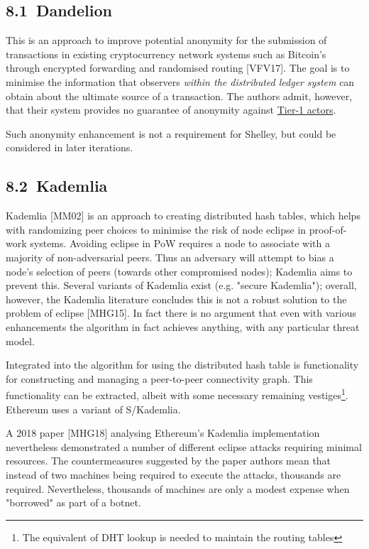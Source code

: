 \documentclass[]{article}
\begin{document}
\hypertarget{dandelion}{%
\subsection{​8.1​~Dandelion}\label{dandelion}}

This is an approach to improve potential anonymity for the submission of
transactions in existing cryptocurrency network systems such as
Bitcoin's through encrypted forwarding and randomised routing
{[}VFV17{]}. The goal is to minimise the information that observers
\emph{within the distributed ledger} \emph{system} can obtain about the
ultimate source of a transaction. The authors admit, however, that their
system provides no guarantee of anonymity against
\protect\hyperlink{tier-1-actors}{{Tier-1 actors}}.

Such anonymity enhancement is not a requirement for Shelley, but could
be considered in later iterations.

\hypertarget{kademlia}{%
\subsection{​8.2​~Kademlia}\label{kademlia}}

Kademlia {[}MM02{]} is an approach to creating distributed hash tables,
which helps with randomizing peer choices to minimise the risk of node
eclipse in proof-of-work systems. Avoiding eclipse in PoW requires a
node to associate with a majority of non-adversarial peers. Thus an
adversary will attempt to bias a node's selection of peers (towards
other compromised nodes); Kademlia aims to prevent this. Several
variants of Kademlia exist (e.g. "secure Kademlia"); overall, however,
the Kademlia literature concludes this is not a robust solution to the
problem of eclipse {[}MHG15{]}. In fact there is no argument that even
with various enhancements the algorithm in fact achieves anything, with
any particular threat model.

Integrated into the algorithm for using the distributed hash table is
functionality for constructing and managing a peer-to-peer connectivity
graph. This functionality can be extracted, albeit with some necessary
remaining vestiges\footnote{The equivalent of DHT lookup is needed to
  maintain the routing tables}. Ethereum uses a variant of S/Kademlia.

A 2018 paper {[}MHG18{]} analysing Ethereum's Kademlia implementation
nevertheless demonstrated a number of different eclipse attacks
requiring minimal resources. The countermeasures suggested by the paper
authors mean that instead of two machines being required to execute the
attacks, thousands are required. Nevertheless, thousands of machines are
only a modest expense when "borrowed" as part of a botnet.
\end{document}
